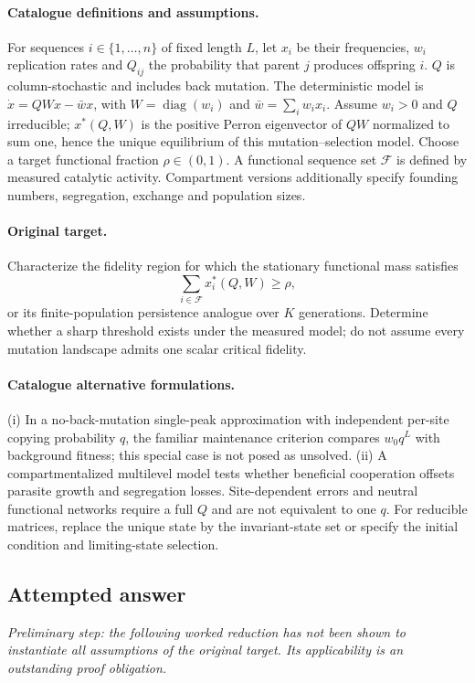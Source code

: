 \documentclass[11pt]{article}
\begin{document}
\paragraph{Catalogue definitions and assumptions.}
For sequences $i\in\{1,\ldots,n\}$ of fixed length $L$, let $x_i$ be their frequencies, $w_i$ replication rates and $Q_{ij}$ the probability that parent $j$ produces offspring $i$. $Q$ is column-stochastic and includes back mutation. The deterministic model is $\dot x=QWx-\bar w x$, with $W=\operatorname{diag}(w_i)$ and $\bar w=\sum_iw_ix_i$. Assume $w_i>0$ and $Q$ irreducible; $x^*(Q,W)$ is the positive Perron eigenvector of $QW$ normalized to sum one, hence the unique equilibrium of this mutation--selection model. Choose a target functional fraction $\rho\in(0,1)$. A functional sequence set $\mathcal F$ is defined by measured catalytic activity. Compartment versions additionally specify founding numbers, segregation, exchange and population sizes.
\paragraph{Original target.}
Characterize the fidelity region for which the stationary functional mass satisfies
\[
\sum_{i\in\mathcal F}x_i^*(Q,W)\geq\rho,
\]
or its finite-population persistence analogue over $K$ generations. Determine whether a sharp threshold exists under the measured model; do not assume every mutation landscape admits one scalar critical fidelity.
\paragraph{Catalogue alternative formulations.}
(i) In a no-back-mutation single-peak approximation with independent per-site copying probability $q$, the familiar maintenance criterion compares $w_0q^L$ with background fitness; this special case is not posed as unsolved. (ii) A compartmentalized multilevel model tests whether beneficial cooperation offsets parasite growth and segregation losses. Site-dependent errors and neutral functional networks require a full $Q$ and are not equivalent to one $q$. For reducible matrices, replace the unique state by the invariant-state set or specify the initial condition and limiting-state selection.
\subsection{Attempted answer}
\noindent\emph{Preliminary step: the following worked reduction has not been shown to instantiate all assumptions of the original target. Its applicability is an outstanding proof obligation.}
\end{document}
